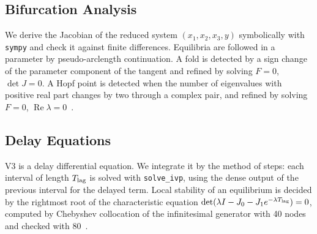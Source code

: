 \documentclass[journal]{IEEEtran}
\begin{document}
\subsection{Bifurcation Analysis}
We derive the Jacobian of the reduced system $(x_1,x_2,x_3,y)$ symbolically with \texttt{sympy}
and check it against finite differences. Equilibria are followed in a parameter by
pseudo-arclength continuation. A fold is detected by a sign change of the parameter component of
the tangent and refined by solving $F=0$, $\det J=0$. A Hopf point is detected when the number of
eigenvalues with positive real part changes by two through a complex pair, and refined by solving
$F=0$, $\operatorname{Re}\lambda=0$~\cite{kuznetsov2004bifurcation}.

\subsection{Delay Equations}
V3 is a delay differential equation. We integrate it by the method of steps: each interval of
length $T_{\rm lag}$ is solved with \texttt{solve\_ivp}, using the dense output of the previous
interval for the delayed term. Local stability of an equilibrium is decided by the rightmost root
of the characteristic equation $\det(\lambda I-J_0-J_1e^{-\lambda T_{\rm lag}})=0$, computed by
Chebyshev collocation of the infinitesimal generator with 40 nodes and checked with
80~\cite{breda2005pseudospectral}.
\end{document}
